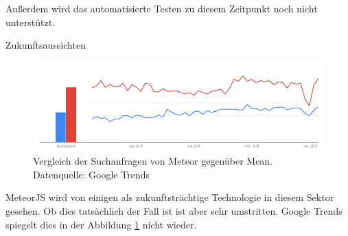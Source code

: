 Außerdem wird das automatisierte Testen zu diesem Zeitpunkt noch nicht unterstützt.

Zukunftsaussichten

\begin{figure}[h]
	\centering
	\includegraphics[width=0.7\linewidth]{figures/meteor-vs-mean.png}
	\caption{Vergleich der Suchanfragen von Meteor gegenüber Mean. Datenquelle: Google Trends \cite{googleTrends:meteorVsMean}}
	\label{f:mean-frameworks:meteorVsMean}
\end{figure}

MeteorJS wird von einigen als zukunftsträchtige Technologie in diesem Sektor gesehen.
Ob dies tatsächlich der Fall ist ist aber sehr umstritten.
Google Trends spiegelt dies in der Abbildung \ref{f:mean-frameworks:meteorVsMean} nicht wieder.